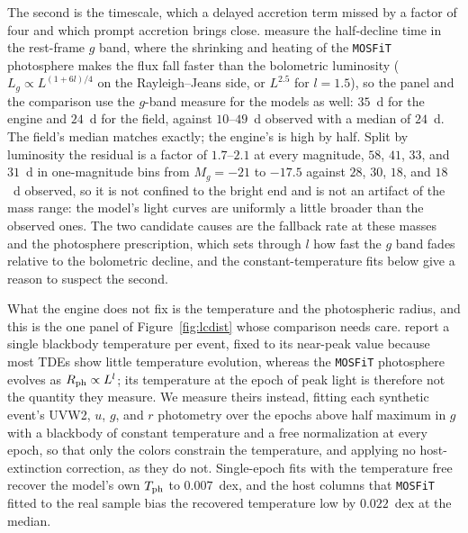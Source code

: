 \documentclass[twocolumn,pdftex]{aastex701}
\newcommand{\mosfit}{{\tt MOSFiT}\xspace}
\begin{document}
The second is the timescale, which a delayed accretion term missed by a factor of four and which prompt accretion brings close. \citet{Yao:2023a} measure the half-decline time in the rest-frame $g$ band, where the shrinking and heating of the \mosfit photosphere makes the flux fall faster than the bolometric luminosity ($L_g \propto L^{(1+6l)/4}$ on the Rayleigh--Jeans side, or $L^{2.5}$ for $l = 1.5$), so the panel and the comparison use the $g$-band measure for the models as well: $35$~d for the engine and $24$~d for the field, against $10$--$49$~d observed with a median of $24$~d. The field's median matches exactly; the engine's is high by half. Split by luminosity the residual is a factor of $1.7$--$2.1$ at every magnitude, $58$, $41$, $33$, and $31$~d in one-magnitude bins from $M_g = -21$ to $-17.5$ against $28$, $30$, $18$, and $18$~d observed, so it is not confined to the bright end and is not an artifact of the mass range: the model's light curves are uniformly a little broader than the observed ones. The two candidate causes are the fallback rate at these masses and the photosphere prescription, which sets through $l$ how fast the $g$ band fades relative to the bolometric decline, and the constant-temperature fits below give a reason to suspect the second.

What the engine does not fix is the temperature and the photospheric radius, and this is the one panel of Figure~\ref{fig:lcdist} whose comparison needs care. \citet{Yao:2023a} report a single blackbody temperature per event, fixed to its near-peak value because most TDEs show little temperature evolution, whereas the \mosfit photosphere evolves as $R_{\rm ph} \propto L^{l}$; its temperature at the epoch of peak light is therefore not the quantity they measure. We measure theirs instead, fitting each synthetic event's UVW2, $u$, $g$, and $r$ photometry over the epochs above half maximum in $g$ with a blackbody of constant temperature and a free normalization at every epoch, so that only the colors constrain the temperature, and applying no host-extinction correction, as they do not. Single-epoch fits with the temperature free recover the model's own $T_{\rm ph}$ to $0.007$~dex, and the host columns that \mosfit fitted to the real sample bias the recovered temperature low by $0.022$~dex at the median.
\end{document}
